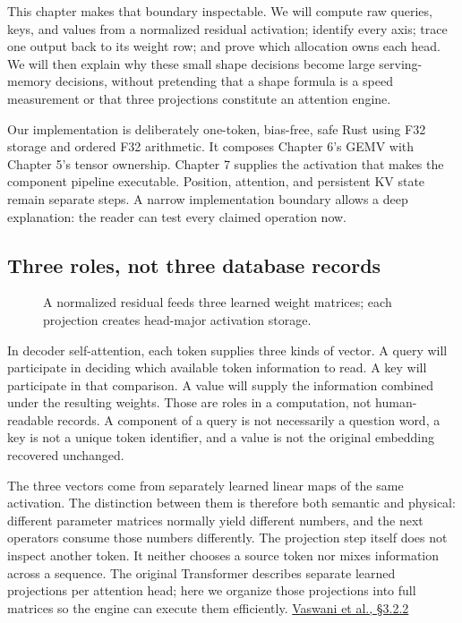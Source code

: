 \documentclass[
  10pt,
]{article}
\begin{document}
This chapter makes that boundary inspectable. We will compute raw
queries, keys, and values from a normalized residual activation;
identify every axis; trace one output back to its weight row; and prove
which allocation owns each head. We will then explain why these small
shape decisions become large serving-memory decisions, without
pretending that a shape formula is a speed measurement or that three
projections constitute an attention engine.

Our implementation is deliberately one-token, bias-free, safe Rust using
F32 storage and ordered F32 arithmetic. It composes Chapter 6's GEMV
with Chapter 5's tensor ownership. Chapter 7 supplies the activation
that makes the component pipeline executable. Position, attention, and
persistent KV state remain separate steps. A narrow implementation
boundary allows a deep explanation: the reader can test every claimed
operation now.

\subsection{Three roles, not three database
records}\label{three-roles-not-three-database-records}

\begin{figure}[H]\centering\resizebox{\linewidth}{!}{}\caption{A normalized residual feeds three learned weight matrices; each projection creates head-major activation storage.}\end{figure}

In decoder self-attention, each token supplies three kinds of vector. A
query will participate in deciding which available token information to
read. A key will participate in that comparison. A value will supply the
information combined under the resulting weights. Those are roles in a
computation, not human-readable records. A component of a query is not
necessarily a question word, a key is not a unique token identifier, and
a value is not the original embedding recovered unchanged.

The three vectors come from separately learned linear maps of the same
activation. The distinction between them is therefore both semantic and
physical: different parameter matrices normally yield different numbers,
and the next operators consume those numbers differently. The projection
step itself does not inspect another token. It neither chooses a source
token nor mixes information across a sequence. The original Transformer
describes separate learned projections per attention head; here we
organize those projections into full matrices so the engine can execute
them efficiently. \href{https://arxiv.org/abs/1706.03762}{Vaswani et
al., §3.2.2}
\end{document}
